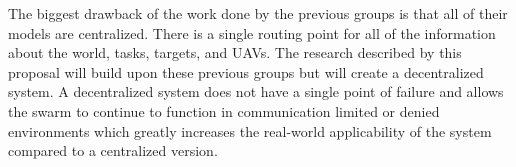 The biggest drawback of the work done by the previous groups is that all of their models are centralized.  There is a single routing point for all of the information about the world, tasks, targets, and UAVs.  The research described by this proposal will build upon these previous groups but will create a decentralized system.  A decentralized system does not have a single point of failure and allows the swarm to continue to function in communication limited or denied environments which greatly increases the real-world applicability of the system compared to a centralized version.